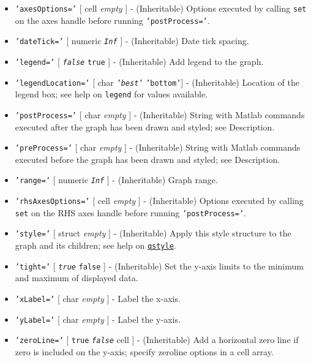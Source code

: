 \begin{itemize}
\item
  \texttt{'axesOptions='} {[} cell \textbar{} \emph{empty} {]} -
  (Inheritable) Options executed by calling \texttt{set} on the axes
  handle before running \texttt{'postProcess='}.
\item
  \texttt{'dateTick='} {[} numeric \textbar{} \emph{\texttt{Inf}} {]} -
  (Inheritable) Date tick spacing.
\item
  \texttt{'legend='} {[} \emph{\texttt{false}} \textbar{} \texttt{true}
  {]} - (Inheritable) Add legend to the graph.
\item
  \texttt{'legendLocation='} {[} char \textbar{} \emph{\texttt{'best'}}
  \textbar{} \texttt{'bottom'}{]} - (Inheritable) Location of the legend
  box; see help on \texttt{legend} for values available.
\item
  \texttt{'postProcess='} {[} char \textbar{} \emph{empty} {]} -
  (Inheritable) String with Matlab commands executed after the graph has
  been drawn and styled; see Description.
\item
  \texttt{'preProcess='} {[} char \textbar{} \emph{empty} {]} -
  (Inheritable) String with Matlab commands executed before the graph
  has been drawn and styled; see Description.
\item
  \texttt{'range='} {[} numeric \textbar{} \emph{\texttt{Inf}} {]} -
  (Inheritable) Graph range.
\item
  \texttt{'rhsAxesOptions='} {[} cell \textbar{} \emph{empty} {]} -
  (Inheritable) Options executed by calling \texttt{set} on the RHS axes
  handle before running \texttt{'postProcess='}.
\item
  \texttt{'style='} {[} struct \textbar{} \emph{empty} {]} -
  (Inheritable) Apply this style structure to the graph and its
  children; see help on \href{qreport/qstyle}{\texttt{qstyle}}.
\item
  \texttt{'tight='} {[} \emph{\texttt{true}} \textbar{} \texttt{false}
  {]} - (Inheritable) Set the y-axis limits to the minimum and maximum
  of displayed data.
\item
  \texttt{'xLabel='} {[} char \textbar{} \emph{empty} {]} - Label the
  x-axis.
\item
  \texttt{'yLabel='} {[} char \textbar{} \emph{empty} {]} - Label the
  y-axis.
\item
  \texttt{'zeroLine='} {[} \texttt{true} \textbar{}
  \emph{\texttt{false}} \textbar{} cell {]} - (Inheritable) Add a
  horizontal zero line if zero is included on the y-axis; specify
  zeroline options in a cell array.
\end{itemize}

